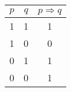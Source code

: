 \begin{table}[h!]
\begin{tabular}{|c|c|c|}
\hline
$p$ & $q$ & $p \Rightarrow q$             \\ \hline
1 & 1 & 1                           \\ \hline
1 & 0 & 0                           \\ \hline
0 & 1 & 1                           \\ \hline
0 & 0 & 1                           \\ \hline
\end{tabular}
\end{table}